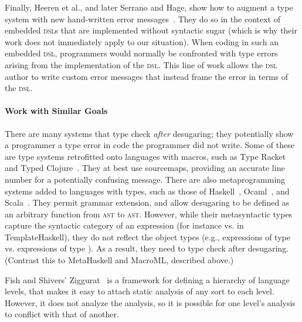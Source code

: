 Finally, Heeren et al., and later Serrano and Hage, show how to
augment a type system with new hand-written error
messages~\cite{type-error-inference,type-error-edsl}. They do so in
the context of embedded \textsc{dsl}s that are implemented without
syntactic sugar (which is why their work does not immediately apply to
our situation). When coding in such an embedded \textsc{dsl},
programmers would normally be confronted with type errors arising from
the implementation of the \textsc{dsl}. This line of work allows the
\textsc{dsl} author to write custom error messages that instead frame
the error in terms of the \textsc{dsl}.


\paragraph{Work with Similar Goals}

There are many systems that type check
\emph{after} desugaring; they
potentially show a programmer a type error
in code the programmer did not write.
Some of these are type systems
retrofitted onto languages with macros, such as  
Type Racket~\cite{languages-as-libraries} and
Typed Clojure~\cite{typed-clojure}.
They at best use sourcemaps, providing an accurate line
number for a potentially confusing message.
There are also metaprogramming
systems added to languages with types, such as those of
Haskell~\cite{TemplateHaskell}, Ocaml~\cite{Camlp5}, and
Scala~\cite{scala-macros}.
They permit grammar extension,
and allow desugaring to be defined as an arbitrary function
from \textsc{ast} to \textsc{ast}.
However, while their metasyntactic types capture the syntactic category of an
expression (for instance  vs.  in TemplateHaskell),
they do not reflect the object types (e.g., expressions of type
 vs. expressions of type ).
As a result, they need to type check after desugaring.
(Contrast this to MetaHaskell and MacroML, described above.)


Fish and Shivers' Ziggurat~\cite{ziggurat} is a framework for defining a
hierarchy of language levels, that makes it easy to attach static
analysis of any sort to each level. However, it does not analyze the
analysis, so it is possible for one level's analysis to conflict
with that of another.

